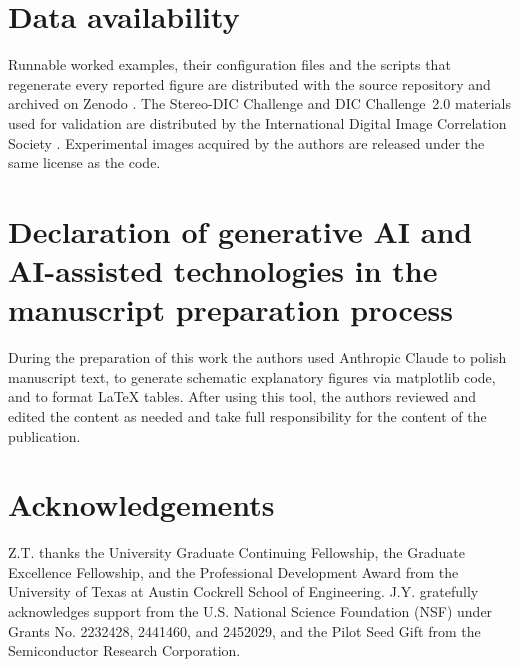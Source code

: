 \section*{Data availability}
Runnable worked examples, their configuration files and the scripts that regenerate every reported figure are distributed with the source repository and archived on Zenodo \cite{pyaldic3d_zenodo}. The Stereo-DIC Challenge and DIC Challenge~2.0 materials used for validation are distributed by the International Digital Image Correlation Society \cite{idics_challenge_site}. Experimental images acquired by the authors are released under the same license as the code.

\section*{Declaration of generative AI and AI-assisted technologies in the manuscript preparation process}
During the preparation of this work the authors used Anthropic Claude to polish manuscript text, to generate schematic explanatory figures via matplotlib code, and to format LaTeX tables. After using this tool, the authors reviewed and edited the content as needed and take full responsibility for the content of the publication.

\section*{Acknowledgements}
Z.T. thanks the University Graduate Continuing Fellowship, the Graduate Excellence Fellowship, and the Professional Development Award from the University of Texas at Austin Cockrell School of Engineering. J.Y. gratefully acknowledges support from the U.S. National Science Foundation (NSF) under Grants No. 2232428, 2441460, and 2452029, and the Pilot Seed Gift from the Semiconductor Research Corporation.





\endinput
